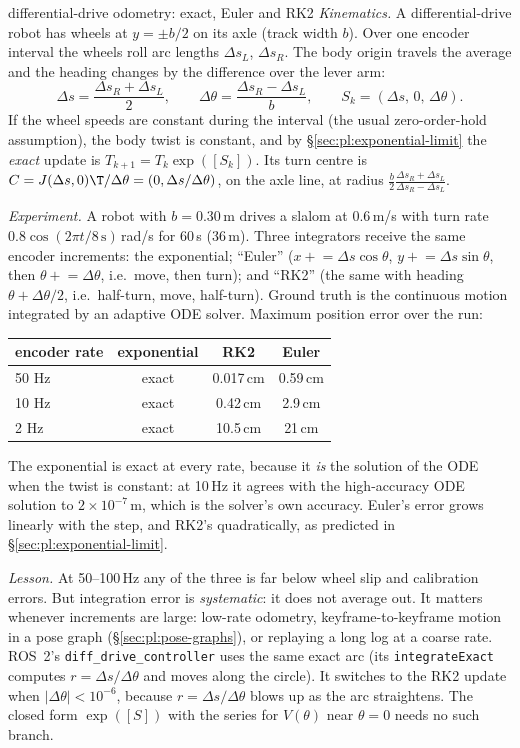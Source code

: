 \begin{example}{differential-drive odometry: exact, Euler and RK2}
\emph{Kinematics.} A differential-drive robot has wheels at $y=\pm b/2$ on its axle (track width $b$). Over one encoder interval the wheels roll arc lengths $\Delta s_L$, $\Delta s_R$. The body origin travels the average and the heading changes by the difference over the lever arm:
\[
\Delta s=\frac{\Delta s_R+\Delta s_L}{2},\qquad\Delta\theta=\frac{\Delta s_R-\Delta s_L}{b},\qquad S_k=(\Delta s,\,0,\,\Delta\theta).
\]
If the wheel speeds are constant during the interval (the usual zero-order-hold assumption), the body twist is constant, and by \S\ref{sec:pl:exponential-limit} the \emph{exact} update is $T_{k+1}=T_k\exp([S_k])$. Its turn centre is $C=J(\Delta s,0)\T/\Delta\theta=(0,\Delta s/\Delta\theta)$, on the axle line, at radius $\frac b2\frac{\Delta s_R+\Delta s_L}{\Delta s_R-\Delta s_L}$.

\emph{Experiment.} A robot with $b=0.30$\,m drives a slalom at $0.6$\,m/s with turn rate $0.8\cos(2\pi t/8\,\text{s})$\,rad/s for 60\,s (36\,m). Three integrators receive the same encoder increments: the exponential; ``Euler'' ($x\mathrel{+}=\Delta s\cos\theta$, $y\mathrel{+}=\Delta s\sin\theta$, then $\theta\mathrel{+}=\Delta\theta$, i.e.\ move, then turn); and ``RK2'' (the same with heading $\theta+\Delta\theta/2$, i.e.\ half-turn, move, half-turn). Ground truth is the continuous motion integrated by an adaptive ODE solver. Maximum position error over the run:
\begin{center}\small
\begin{tabular}{@{}lccc@{}}\toprule
encoder rate & exponential & RK2 & Euler\\\midrule
50 Hz & exact & 0.017\,cm & 0.59\,cm\\
10 Hz & exact & 0.42\,cm & 2.9\,cm\\
2 Hz & exact & 10.5\,cm & 21\,cm\\\bottomrule
\end{tabular}
\end{center}
The exponential is exact at every rate, because it \emph{is} the solution of the ODE when the twist is constant: at 10\,Hz it agrees with the high-accuracy ODE solution to $2\times10^{-7}$\,m, which is the solver's own accuracy. Euler's error grows linearly with the step, and RK2's quadratically, as predicted in \S\ref{sec:pl:exponential-limit}.

\emph{Lesson.} At 50--100\,Hz any of the three is far below wheel slip and calibration errors. But integration error is \emph{systematic}: it does not average out. It matters whenever increments are large: low-rate odometry, keyframe-to-keyframe motion in a pose graph (\S\ref{sec:pl:pose-graphs}), or replaying a long log at a coarse rate. ROS~2's \texttt{diff\_drive\_controller} uses the same exact arc (its \texttt{integrateExact} computes $r=\Delta s/\Delta\theta$ and moves along the circle). It switches to the RK2 update when $|\Delta\theta|<10^{-6}$, because $r=\Delta s/\Delta\theta$ blows up as the arc straightens. The closed form $\exp([S])$ with the series for $V(\theta)$ near $\theta=0$ needs no such branch.
\end{example}
